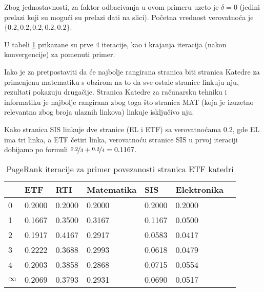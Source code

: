 \documentclass[12pt, journal, compsoc]{IEEEtran}
\begin{document}
Zbog jednostavnosti, za faktor odbacivanja u ovom primeru uzeto je $\delta = 0$ (jedini prelazi koji su mogući su prelazi dati na slici).
Početna vrednost verovatnoća je $\{0.2, 0.2, 0.2, 0.2, 0.2\}$. 

U tabeli \ref{iteracije_primer} prikazane su prve 4 iteracije, kao i krajanja iteracija (nakon konvergencije) za pomenuti primer.

Iako je za pretpostaviti da će najbolje rangirana stranica biti stranica Katedre za primenjenu matematiku s obzirom na to da sve ostale stranice linkuju nju, rezultati pokazuju drugačije. Stranica Katedre za računarsku tehniku i informatiku je najbolje rangirana zbog toga što stranica MAT (koja je izuzetno relevantna zbog broja ulaznih linkova) linkuje isključivo nju.

Kako stranica SIS linkuje dve stranice (EL i ETF) sa verovatnoćama $0.2$, gde EL ima tri linka, a ETF četiri linka, verovatnoću stranice SIS u prvoj iteraciji dobijamo po formuli $\nicefrac{0.2}{3} + \nicefrac{0.2}{4} = 0.1167$.

\begin{figure}[h]
\end{figure}

\begin{table}[]
\centering
\begin{tabular}{|l|l|l|l|l|l|l|}
\hline
    & ETF & RTI & Matematika  & SIS & Elektronika  \\ \hline
0   & 0.2000  & 0.2000 &  0.2000  & 0.2000  &  0.2000   \\ \hline
1   & 0.1667  & 0.3500 &  0.3167  & 0.1167  &  0.0500   \\ \hline
2   & 0.1917  & 0.4167 &  0.2917  & 0.0583  &  0.0417   \\ \hline
3   & 0.2222  & 0.3688 &  0.2993  & 0.0618  &  0.0479   \\ \hline
4   & 0.2003  & 0.3858 &  0.2868  & 0.0715  &  0.0554  \\ \hline
$\infty$   & 0.2069  & 0.3793 &  0.2931  & 0.0690  &  0.0517 \\ \hline
\end{tabular}
\caption{PageRank iteracije za primer povezanosti stranica ETF katedri}
\label{iteracije_primer}
\end{table}
\end{document}
